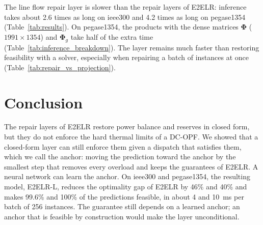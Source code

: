 \documentclass[12pt]{article}
\begin{document}
The line flow repair layer is slower than the repair layers of E2ELR: inference takes about 2.6 times as long on ieee300 and 4.2 times as long on pegase1354 (Table~\ref{tab:results}).
On pegase1354, the products with the dense matrices $\boldsymbol{\Phi}$ ($1991 \times 1354$) and $\boldsymbol{\Phi}_g$ take half of the extra time (Table~\ref{tab:inference_breakdown}).
The layer remains much faster than restoring feasibility with a solver, especially when repairing a batch of instances at once (Table~\ref{tab:repair_vs_projection}).

\section{Conclusion}
The repair layers of E2ELR restore power balance and reserves in closed form, but they do not enforce the hard thermal limits of a DC-OPF.
We showed that a closed-form layer can still enforce them given a dispatch that satisfies them, which we call the anchor: moving the prediction toward the anchor by the smallest step that removes every overload and keeps the guarantees of E2ELR.
A neural network can learn the anchor.
On ieee300 and pegase1354, the resulting model, E2ELR-L, reduces the optimality gap of E2ELR by 46\% and 40\% and makes 99.6\% and 100\% of the predictions feasible, in about 4 and 10~ms per batch of 256 instances.
The guarantee still depends on a learned anchor; an anchor that is feasible by construction would make the layer unconditional.




\end{document}
